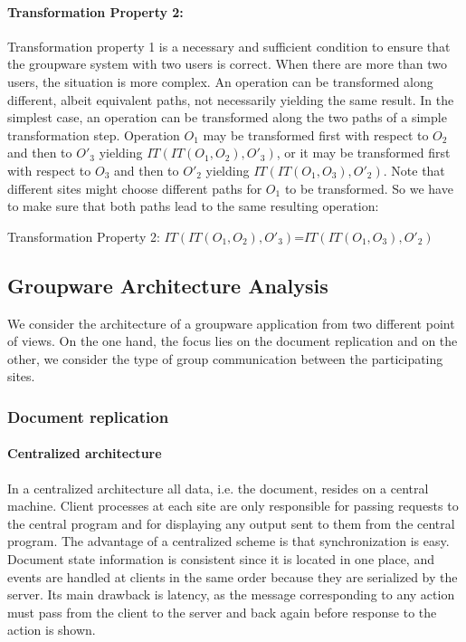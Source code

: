\documentclass[11pt,a4paper]{article}
\begin{document}
\paragraph{Transformation Property 2:}
Transformation property 1 is a necessary and sufficient condition to ensure that the groupware system with two users is correct. When there are more than two users, the situation is more complex. An operation can be transformed along different, albeit equivalent paths, not necessarily yielding the same result. In the simplest case, an operation can be transformed along the two paths of a simple transformation step. Operation $O_{1}$ may be transformed first with respect to $O_{2}$ and then to $O'_{3}$ yielding $IT(IT(O_{1},O_{2}),O'_{3})$, or it may be transformed first with respect to $O_{3}$ and then to $O'_{2}$ yielding $IT(IT(O_{1},O_{3}),O'_{2})$. Note that different sites might choose different paths for $O_{1}$ to be transformed. So we have to make sure that both paths lead to the same resulting operation:

\begin{defn}
Transformation Property 2: 
$IT(IT(O_{1},O_{2}),O'_{3})$=$IT(IT(O_{1},O_{3}),O'_{2})$
\end{defn}


\subsection{Groupware Architecture Analysis} We consider the architecture of a groupware application from two different point of views. On the one hand, the focus lies on the document replication and on the other, we consider the type of group communication between the participating sites.

\subsubsection{Document replication}

\paragraph{Centralized architecture} In a centralized architecture all data, i.e. the document, resides on a central machine. Client processes at each site are only responsible for passing requests to the central program and for displaying any output sent to them from the central program. The advantage of a centralized scheme is that synchronization is easy. Document state information is consistent since it is located in one place, and events are handled at clients in the same order because they are serialized by the server. Its main drawback is latency, as the message corresponding to any action must pass from the client to the server and back again before response to the action is shown.
\end{document}
